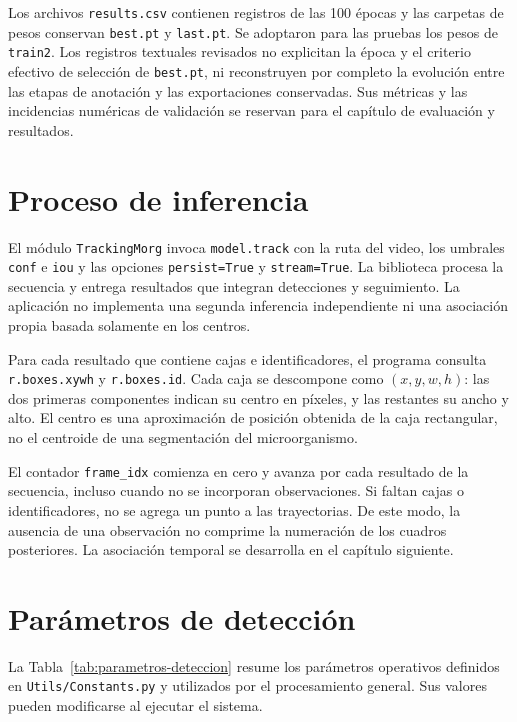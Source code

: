 Los archivos \texttt{results.csv} contienen registros de las 100 épocas y las carpetas de pesos conservan \texttt{best.pt} y \texttt{last.pt}. Se adoptaron para las pruebas los pesos de \texttt{train2}. Los registros textuales revisados no explicitan la época y el criterio efectivo de selección de \texttt{best.pt}, ni reconstruyen por completo la evolución entre las etapas de anotación y las exportaciones conservadas. Sus métricas y las incidencias numéricas de validación se reservan para el capítulo de evaluación y resultados.

\section{Proceso de inferencia}

El módulo \texttt{TrackingMorg} invoca \texttt{model.track} con la ruta del video, los umbrales \texttt{conf} e \texttt{iou} y las opciones \texttt{persist=True} y \texttt{stream=True}. La biblioteca procesa la secuencia y entrega resultados que integran detecciones y seguimiento. La aplicación no implementa una segunda inferencia independiente ni una asociación propia basada solamente en los centros.

Para cada resultado que contiene cajas e identificadores, el programa consulta \texttt{r.boxes.xywh} y \texttt{r.boxes.id}. Cada caja se descompone como $(x,y,w,h)$: las dos primeras componentes indican su centro en píxeles, y las restantes su ancho y alto. El centro es una aproximación de posición obtenida de la caja rectangular, no el centroide de una segmentación del microorganismo.

El contador \texttt{frame\_idx} comienza en cero y avanza por cada resultado de la secuencia, incluso cuando no se incorporan observaciones. Si faltan cajas o identificadores, no se agrega un punto a las trayectorias. De este modo, la ausencia de una observación no comprime la numeración de los cuadros posteriores. La asociación temporal se desarrolla en el capítulo siguiente.

\section{Parámetros de detección}

La Tabla~\ref{tab:parametros-deteccion} resume los parámetros operativos definidos en \texttt{Utils/Constants.py} y utilizados por el procesamiento general. Sus valores pueden modificarse al ejecutar el sistema.

